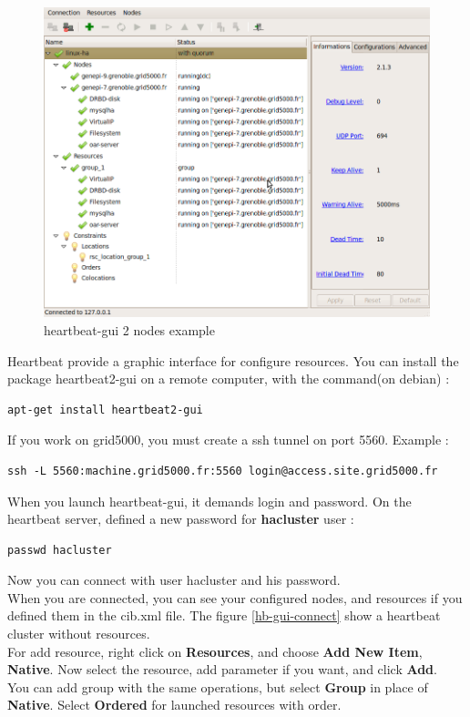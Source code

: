 \documentclass[a4paper,10pt]{report}
\begin{document}
\begin{figure}
\includegraphics[scale=0.5]{schema/hb_gui-2nodes.png}
\caption{heartbeat-gui 2 nodes example} 
\label{hb-gui-2nodes} 
\end{figure}


Heartbeat provide a graphic interface for configure resources. You can install the package heartbeat2-gui on a remote computer, with the command(on debian) :
\begin{lstlisting}
apt-get install heartbeat2-gui
\end{lstlisting}
If you work on grid5000, you must create a ssh tunnel on port 5560. Example :
\begin{lstlisting}
ssh -L 5560:machine.grid5000.fr:5560 login@access.site.grid5000.fr
\end{lstlisting}
When you launch heartbeat-gui, it demands login and password. On the heartbeat server, defined a new password for \textbf{hacluster} user :
\begin{lstlisting}
passwd hacluster
\end{lstlisting}
Now you can connect with user hacluster and his password.\\

When you are connected, you can see your configured nodes, and resources if you defined them in the cib.xml file. The figure \ref{hb-gui-connect} show a heartbeat cluster without resources.\\

For add resource, right click on \textbf{Resources}, and choose \textbf{Add New Item}, \textbf{Native}. Now select the resource, add parameter if you want, and click \textbf{Add}.\\
You can add group with the same operations, but select \textbf{Group} in place of \textbf{Native}. Select \textbf{Ordered} for launched resources with order.\\
\end{document}
